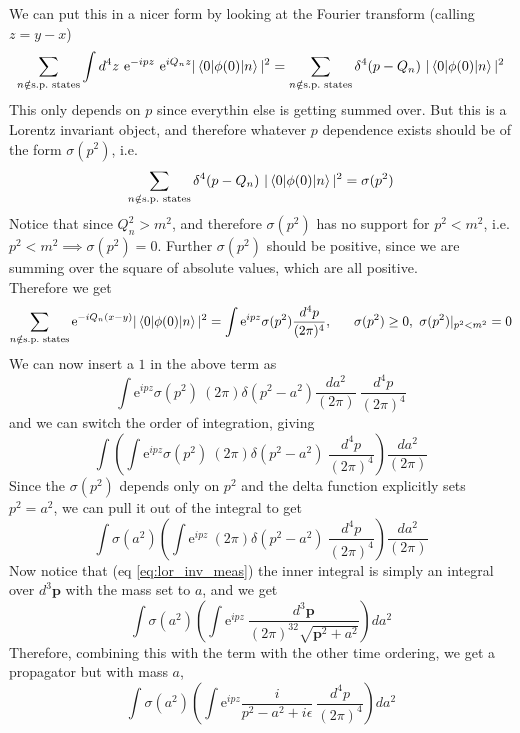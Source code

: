 \documentclass[11pt, notitlepage]{report}
\newcommand{\e}{\mathrm{e}}
\numberwithin{equation}{section}
\begin{document}
We can put this in a nicer form by looking at the Fourier transform (calling \(z=y-x\))
\begin{equation*}
    \sum_{n\notin \text{s.p.\ states}}\int d^4z ~\e^{-ipz}~ \e^{iQ_nz}|\braket{0|\phi(0)|n}|^2 = \sum_{n\notin \text{s.p.\ states}} \delta^4(p-Q_n)~|\braket{0|\phi(0)|n}|^2
\end{equation*}
This only depends on \(p\) since everythin else is getting summed over. But this is a Lorentz invariant object, and therefore whatever \(p\) dependence exists should be of the form \(\sigma(p^2)\), i.e. 
\begin{equation*}
    \sum_{n\notin \text{s.p.\ states}} \delta^4(p-Q_n)~|\braket{0|\phi(0)|n}|^2 = \sigma(p^2)
\end{equation*}
Notice that since \(Q_n^2 > m^2\), and therefore \(\sigma(p^2)\) has no support for \(p^2< m^2\), i.e. \(p^2<m^2 \implies \sigma(p^2) = 0\). Further \(\sigma(p^2)\) should be positive, since we are summing over the square of absolute values, which are all positive.\\
Therefore we get 
\begin{equation*}
    \sum_{n\notin \text{s.p.\ states}}\e^{-iQ_n(x-y)}|\braket{0|\phi(0)|n}|^2 = \int \e^{ipz} \sigma(p^2) \frac{d^4p}{(2\pi)^4}, ~~~~~\sigma(p^2)\ge 0,~\sigma(p^2)|_{p^2<m^2} = 0
\end{equation*}
We can now insert a \(1\) in the above term as
\begin{equation*}
    \int \e^{ipz} \sigma(p^2) ~(2\pi)\delta(p^2-a^2) \frac{da^2}{(2\pi)} ~\frac{d^4p}{(2\pi)^4}
\end{equation*}
and we can switch the order of integration, giving 
\begin{equation*}
    \int \left(\int  \e^{ipz} \sigma(p^2) ~(2\pi)\delta(p^2-a^2) ~\frac{d^4p}{(2\pi)^4}\right)\frac{da^2}{(2\pi)} 
\end{equation*}
Since the \(\sigma(p^2)\) depends only on \(p^2\) and the delta function explicitly sets \(p^2 = a^2\), we can pull it out of the integral to get 
\begin{equation*}
    \int \sigma(a^2) \left(\int  \e^{ipz} ~(2\pi)\delta(p^2-a^2) ~\frac{d^4p}{(2\pi)^4}\right)\frac{da^2}{(2\pi)} 
\end{equation*}
Now notice that (eq \ref{eq:lor_inv_meas}) the inner integral is simply an integral over \(d^3\textbf{p}\) with the mass set to \(a\), and we get 
\begin{equation*}
    \int \sigma(a^2) \left(\int  \e^{ipz} ~\frac{d^3\textbf{p}}{(2\pi)^32\sqrt{\textbf{p}^2 + a^2}}\right)da^2 
\end{equation*}
Therefore, combining this with the term with the other time ordering, we get a propagator but with mass \(a\),
\begin{equation*}
    \int \sigma(a^2) \left(\int  \e^{ipz}\frac{i}{p^2 - a^2 + i\epsilon} ~\frac{d^4p}{(2\pi)^4}\right)da^2
\end{equation*}
\end{document}
